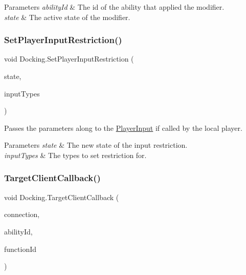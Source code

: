\begin{DoxyParams}{Parameters}
{\em ability\+Id} & The id of the ability that applied the modifier.\\
\hline
{\em state} & The active state of the modifier.\\
\hline
\end{DoxyParams}
\hypertarget{class_docking_af4528d1af51f10ab75d161095f6eb7f3}{}\label{class_docking_af4528d1af51f10ab75d161095f6eb7f3} 
\subsubsection{\texorpdfstring{Set\+Player\+Input\+Restriction()}{SetPlayerInputRestriction()}}
{\footnotesize\ttfamily void Docking.\+Set\+Player\+Input\+Restriction (\begin{DoxyParamCaption}\item[{bool}]{state,  }\item[{params Input\+Type \mbox{[}$\,$\mbox{]}}]{input\+Types }\end{DoxyParamCaption})}



Passes the parameters along to the \hyperlink{class_player_input}{Player\+Input} if called by the local player. 


\begin{DoxyParams}{Parameters}
{\em state} & The new state of the input restriction.\\
\hline
{\em input\+Types} & The types to set restriction for.\\
\hline
\end{DoxyParams}
\hypertarget{class_docking_ad341303ed88d02d37ccd165ab5bef8bb}{}\label{class_docking_ad341303ed88d02d37ccd165ab5bef8bb} 
\subsubsection{\texorpdfstring{Target\+Client\+Callback()}{TargetClientCallback()}}
{\footnotesize\ttfamily void Docking.\+Target\+Client\+Callback (\begin{DoxyParamCaption}\item[{Network\+Connection}]{connection,  }\item[{int}]{ability\+Id,  }\item[{int}]{function\+Id }\end{DoxyParamCaption})}



